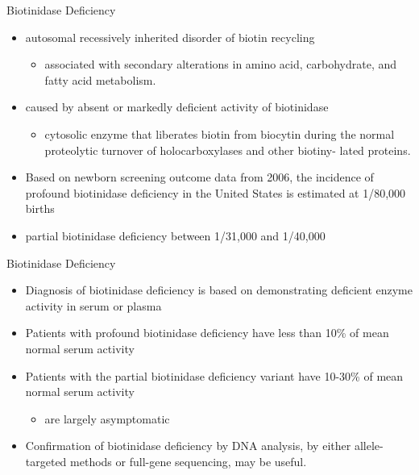 \documentclass[presentation, smaller]{beamer}
\begin{document}
\begin{frame}[label={sec:orgheadline1}]{Biotinidase Deficiency}
\begin{itemize}
\item autosomal recessively inherited disorder of biotin recycling
\begin{itemize}
\item associated with secondary alterations in amino acid, carbohydrate,
and fatty acid metabolism.
\end{itemize}
\item caused by absent or markedly deficient activity of biotinidase
\begin{itemize}
\item cytosolic enzyme that liberates biotin from biocytin during the
normal proteolytic turnover of holocarboxylases and other biotiny-
lated proteins.
\end{itemize}

\item Based on newborn screening outcome data from 2006, the incidence of
profound biotinidase deficiency in the United States is estimated at
1/80,000 births
\item partial biotinidase deficiency between 1/31,000 and 1/40,000
\end{itemize}
\end{frame}

\begin{frame}[label={sec:orgheadline2}]{Biotinidase Deficiency}
\begin{itemize}
\item Diagnosis of biotinidase deficiency is based on demonstrating
deficient enzyme activity in serum or plasma

\item Patients with profound biotinidase deficiency have less than 10\% of
mean normal serum activity

\item Patients with the partial biotinidase deficiency variant have 10-30\%
of mean normal serum activity
\begin{itemize}
\item are largely asymptomatic
\end{itemize}

\item Confirmation of biotinidase deficiency by DNA analysis, by either
allele-targeted methods or full-gene sequencing, may be useful.
\end{itemize}
\end{frame}
\end{document}

